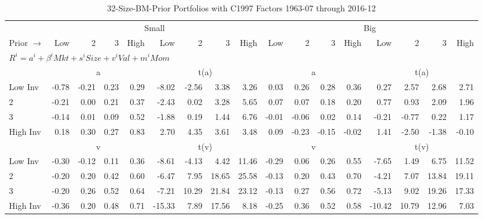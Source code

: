 
\begin{table}[!ht]
\centering
\caption{32-Size-BM-Prior Portfolios with C1997 Factors 1963-07 through 2016-12}
\begin{tabular}{lrrrrrrrrrrrrrrrr}
  \toprule
    & \multicolumn{8}{c}{Small} & \multicolumn{8}{c}{Big} \\
      \cmidrule(r){2-9} \cmidrule(r){10-17}
    Prior $\rightarrow$ & Low & 2 & 3 & High & Low & 2 & 3 & High & Low & 2 & 3 & High & Low & 2 & 3 & High \\ 
  \midrule
  \multicolumn{17}{l}{$R^i=a^i+\beta^iMkt+s^iSize+v^iVal+m^iMom$} \\

  
    
      & \multicolumn{4}{c}{a} & \multicolumn{4}{c}{t(a)}
    
      & \multicolumn{4}{c}{a} & \multicolumn{4}{c}{t(a)}
    
    \\
      \cmidrule(r){2-5} \cmidrule(r){6-9} \cmidrule(r){10-13} \cmidrule(r){14-17}

    Low Inv   & -0.78  & -0.21  & 0.23  & 0.29  & -8.02  & -2.56  & 3.38  & 3.26  & 0.03  & 0.26  & 0.28  & 0.36  & 0.27  & 2.57  & 2.68  & 2.71  \\
           2  & -0.21  & 0.00  & 0.21  & 0.37  & -2.43  & 0.02  & 3.28  & 5.65  & 0.07  & 0.07  & 0.18  & 0.20  & 0.77  & 0.93  & 2.09  & 1.96  \\
           3  & -0.14  & 0.01  & 0.09  & 0.52  & -1.88  & 0.19  & 1.44  & 6.76  & -0.01  & -0.06  & 0.02  & 0.14  & -0.21  & -0.77  & 0.22  & 1.17  \\
    High Inv  & 0.18  & 0.30  & 0.27  & 0.83  & 2.70  & 4.35  & 3.61  & 3.48  & 0.09  & -0.23  & -0.15  & -0.02  & 1.41  & -2.50  & -1.38  & -0.10  \\

  
    
      & \multicolumn{4}{c}{v} & \multicolumn{4}{c}{t(v)}
    
      & \multicolumn{4}{c}{v} & \multicolumn{4}{c}{t(v)}
    
    \\
      \cmidrule(r){2-5} \cmidrule(r){6-9} \cmidrule(r){10-13} \cmidrule(r){14-17}

    Low Inv   & -0.30  & -0.12  & 0.11  & 0.36  & -8.61  & -4.13  & 4.42  & 11.46  & -0.29  & 0.06  & 0.26  & 0.55  & -7.65  & 1.49  & 6.75  & 11.52  \\
           2  & -0.20  & 0.20  & 0.42  & 0.60  & -6.47  & 7.95  & 18.65  & 25.58  & -0.13  & 0.20  & 0.43  & 0.70  & -4.21  & 7.07  & 13.84  & 19.11  \\
           3  & -0.20  & 0.26  & 0.52  & 0.64  & -7.21  & 10.29  & 21.84  & 23.12  & -0.13  & 0.27  & 0.56  & 0.72  & -5.13  & 9.02  & 19.26  & 17.33  \\
    High Inv  & -0.36  & 0.20  & 0.48  & 0.71  & -15.33  & 7.89  & 17.56  & 8.18  & -0.25  & 0.36  & 0.52  & 0.58  & -10.42  & 10.79  & 12.96  & 7.03  \\


\end{tabular}
\end{table}
